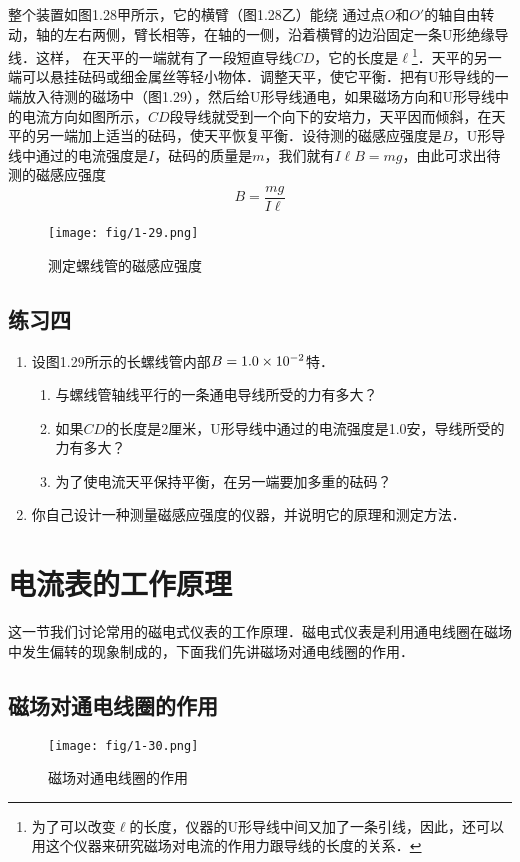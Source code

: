 整个装置如图1.28甲所示，它的横臂（图1.28乙）能绕
通过点$O$和$O'$的轴自由转动，轴的左右两侧，臂长相等，在轴的一侧，沿着横臂的边沿固定一条U形绝缘导线．这样，
在天平的一端就有了一段短直导线$CD$，它的长度是$\ell$\footnote{为了可以改变$\ell$的长度，仪器的U形导线中间又加了一条引线，因此，还可以用这个仪器来研究磁场对电流的作用力跟导线的长度的关系．}．天平的另一端可以悬挂砝码或细金属丝等轻小物体．调整天平，使它平衡．把有U形导线的一端放入待测的磁场中（图1.29），然后给U形导线通电，如果磁场方向和U形导线中的电流方向如图所示，$CD$段导线就受到一个向下的安培力，天平因而倾斜，在天平的另一端加上适当的砝码，使天平恢复平衡．设待测的磁感应强度是$B$，U形导线中通过的电流强度是$I$，砝码的质量是$m$，我们就有$I\ell B=mg$，由此可求出待测的磁感应强度
\[B=\frac{mg}{I\ell}\]
    \begin{figure}[htp]\centering
	\texttt{[image: fig/1-29.png]}
	\caption{测定螺线管的磁感应强度}
\end{figure}

\subsection*{练习四}
\begin{enumerate}
    \item 设图1.29所示的长螺线管内部$B=1.0\times10^{-2}$特．
    \begin{enumerate}
        \item 与螺线管轴线平行的一条通电导线所受的力有多大？
        \item 如果$CD$的长度是2厘米，U形导线中通过的电流强度是1.0安，导线所受的力有多大？
        \item 为了使电流天平保持平衡，在另一端要加多重的砝码？
    \end{enumerate}
    \item 你自己设计一种测量磁感应强度的仪器，并说明它的原理和测定方法．
\end{enumerate}


\section{电流表的工作原理}
这一节我们讨论常用的磁电式仪表的工作原理．磁电式仪表是利用通电线圈在磁场中发生偏转的现象制成的，下面我们先讲磁场对通电线圈的作用．

\subsection{磁场对通电线圈的作用}
    \begin{figure}[htp]\centering
	\texttt{[image: fig/1-30.png]}
	\caption{磁场对通电线圈的作用}
\end{figure}

